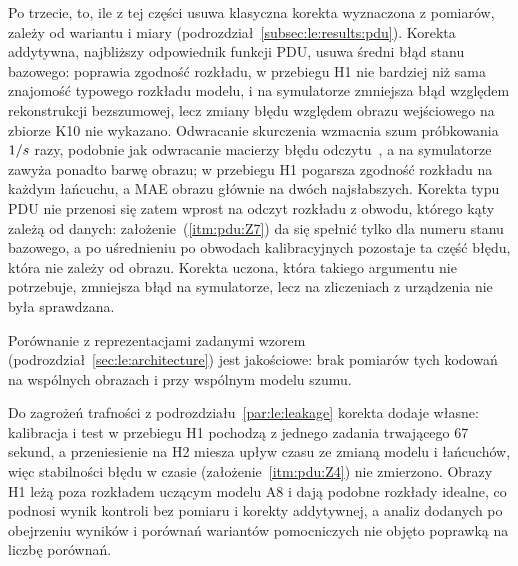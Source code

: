 Po trzecie, to, ile z tej części usuwa klasyczna korekta wyznaczona z pomiarów, zależy od wariantu i miary (podrozdział~\ref{subsec:le:results:pdu}).
Korekta addytywna, najbliższy odpowiednik funkcji PDU, usuwa średni błąd stanu bazowego: poprawia zgodność rozkładu, w przebiegu H1 nie bardziej niż sama znajomość typowego rozkładu modelu, i na symulatorze zmniejsza błąd względem rekonstrukcji bezszumowej, lecz zmiany błędu względem obrazu wejściowego na zbiorze K10 nie wykazano.
Odwracanie skurczenia wzmacnia szum próbkowania $1/s$ razy, podobnie jak odwracanie macierzy błędu odczytu~\cite{nachman_unfolding_2020}, a na symulatorze zawyża ponadto barwę obrazu; w przebiegu H1 pogarsza zgodność rozkładu na każdym łańcuchu, a MAE obrazu głównie na dwóch najsłabszych.
Korekta typu PDU nie przenosi się zatem wprost na odczyt rozkładu z obwodu, którego kąty zależą od danych: założenie~(\ref{itm:pdu:Z7}) da się spełnić tylko dla numeru stanu bazowego, a po uśrednieniu po obwodach kalibracyjnych pozostaje ta część błędu, która nie zależy od obrazu.
Korekta uczona, która takiego argumentu nie potrzebuje, zmniejsza błąd na symulatorze, lecz na zliczeniach z urządzenia nie była sprawdzana.

Porównanie z reprezentacjami zadanymi wzorem (podrozdział~\ref{sec:le:architecture}) jest jakościowe: brak pomiarów tych kodowań na wspólnych obrazach i przy wspólnym modelu szumu.

Do zagrożeń trafności z podrozdziału~\ref{par:le:leakage} korekta dodaje własne: kalibracja i test w przebiegu H1 pochodzą z jednego zadania trwającego 67 sekund, a przeniesienie na H2 miesza upływ czasu ze zmianą modelu i łańcuchów, więc stabilności błędu w czasie (założenie~\ref{itm:pdu:Z4}) nie zmierzono.
Obrazy H1 leżą poza rozkładem uczącym modelu A8 i dają podobne rozkłady idealne, co podnosi wynik kontroli bez pomiaru i korekty addytywnej, a analiz dodanych po obejrzeniu wyników i porównań wariantów pomocniczych nie objęto poprawką na liczbę porównań.

